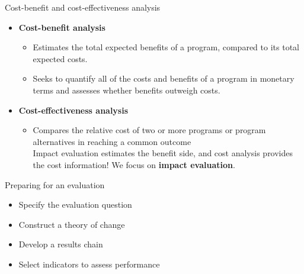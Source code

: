 \documentclass[
  ignorenonframetext,
]{beamer}
\providecommand{\tightlist}{%
  \setlength{\itemsep}{0pt}\setlength{\parskip}{0pt}}
\begin{document}
\begin{frame}{Cost-benefit and cost-effectiveness analysis}
\label{cost-benefit-and-cost-effectiveness-analysis}
\begin{itemize}
\tightlist
\item
  \textbf{Cost-benefit analysis}

  \begin{itemize}
  \tightlist
  \item
    Estimates the total expected benefits of a program, compared to its
    total expected costs.\\
  \item
    Seeks to quantify all of the costs and benefits of a program in
    monetary terms and assesses whether benefits outweigh costs.\\
  \end{itemize}
\item
  \textbf{Cost-effectiveness analysis}

  \begin{itemize}
  \tightlist
  \item
    Compares the relative cost of two or more programs or program
    alternatives in reaching a common outcome\\
    Impact evaluation estimates the benefit side, and cost analysis
    provides the cost information! We focus on \textbf{impact
    evaluation}.
  \end{itemize}
\end{itemize}
\end{frame}

\begin{frame}{Preparing for an evaluation}
\label{preparing-for-an-evaluation}
\begin{itemize}
\tightlist
\item
  Specify the evaluation question\\
\item
  Construct a theory of change\\
\item
  Develop a results chain\\
\item
  Select indicators to assess performance
\end{itemize}
\end{frame}
\end{document}
